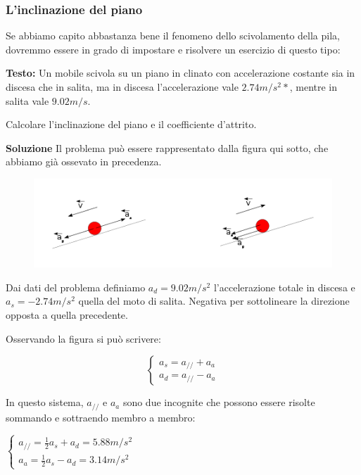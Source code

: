 \subsubsection*{L'inclinazione del piano}

Se abbiamo capito abbastanza bene il fenomeno dello scivolamento della pila, dovremmo essere in grado di impostare e risolvere un esercizio di questo tipo:\newline

{\bf Testo:}
Un mobile scivola su un piano in clinato con accelerazione costante sia in discesa che in salita, ma in discesa l'accelerazione vale $2.74 m/{s^2*}$, mentre in salita vale $9.02 {m/s}$.

Calcolare l'inclinazione del piano e il coefficiente d'attrito.\newline

{\bf Soluzione}
Il problema può essere rappresentato dalla figura qui sotto, che abbiamo già ossevato in precedenza.

\begin{figure}[H]
 \centering
 \includegraphics[width=.7\textwidth]{../immagini/leCauseDelMotoDellaPila.png}
 \label{fig:causeDelMotoDellaPila}
\end{figure}

Dai dati del problema definiamo $a_d = 9.02 m/{s^2}$ l'accelerazione totale in discesa e $a_s = - 2.74 m/{s^2}$ quella del moto di salita. Negativa per sottolineare la direzione opposta a quella precedente.

Osservando la figura si può scrivere:
\begin{center}
\begin{equation}
\left\{
\begin{array}{r}
a_s = a_{//} + a_a \\
a_d = a_{//} - a_a
\end{array}
\right.
\end{equation}
\end{center}

In questo sistema, $a_{//}$ e $a_a$ sono due incognite che possono essere risolte sommando e sottraendo membro a membro:\newline

\begin{center}
\begin{math}
\left\{
\begin{array}{r}
a_{//} = \frac{1}{2} a_s + a_d = 5.88 m/{s^2} \\
a_a = \frac{1}{2} a_s - a_d = 3.14 m/{s^2}
\end{array}
\right.
\end{math}
\end{center}

